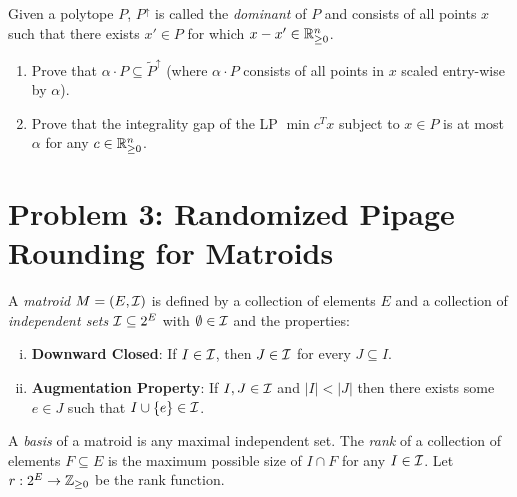 Given a polytope $P$, $P^\uparrow$ is called the \textit{dominant} of $P$ and consists of all points $x$ such that there exists $x' \in P$ for which $x-x' \in \mathbb R^n_{\ge 0}$.
\begin{enumerate}
	\item Prove that $\alpha \cdot P \subseteq \tilde{P}^\uparrow$ (where $\alpha \cdot P$ consists of all points in $x$ scaled entry-wise by $\alpha$).
	\item Prove that the integrality gap of the LP $\min c^Tx$ subject to $x \in P$ is at most $\alpha$ for any $c \in \mathbb R^n_{\ge 0}$.
\end{enumerate}

\section{Problem 3: Randomized Pipage Rounding for Matroids}

A \textit{matroid} $M=(E,{\cal I})$ is defined by a collection of elements $E$ and a collection of \textit{independent sets} ${\cal I} \subseteq 2^E$ with $\emptyset \in {\cal I}$ and the properties:
\begin{enumerate}[(i)]
\item \textbf{Downward Closed}: If $I \in {\cal I}$, then $J \in {\cal I}$ for every $J \subseteq I$.
\item \textbf{Augmentation Property}: If $I,J \in {\cal I}$ and $|I| < |J|$ then there exists some $e \in J$ such that $I \cup \{e\} \in {\cal I}$. 
\end{enumerate}
A \textit{basis} of a matroid is any maximal independent set. The \textit{rank} of a collection of elements $F \subseteq E$ is the maximum possible size of $I \cap F$ for any $I \in {\cal I}$. Let $r: 2^E \to \mathbb Z_{\ge 0}$ be the rank function.

